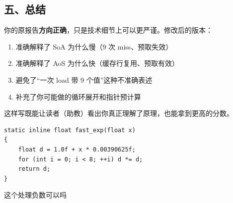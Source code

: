 \documentclass[11pt, a4paper]{article}
\begin{document}
\begin{aibox}
\subsection*{五、总结}

你的原报告\textbf{方向正确}，只是技术细节上可以更严谨。修改后的版本：
\begin{enumerate}
    \item [$\checkmark$] 准确解释了 SoA 为什么慢（9 次 miss、预取失效）
    \item [$\checkmark$] 准确解释了 AoS 为什么快（缓存行复用、预取有效）
    \item [$\checkmark$] 避免了“一次 load 带 9 个值”这种不准确表述
    \item [$\checkmark$] 补充了你可能做的循环展开和指针预计算
\end{enumerate}

这样写既能让读者（助教）看出你真正理解了原理，也能拿到更高的分数。
\end{aibox}

\vspace{1.5em}

\begin{userbox}
\begin{verbatim}
static inline float fast_exp(float x)
{
    float d = 1.0f + x * 0.00390625f;
    for (int i = 0; i < 8; ++i) d *= d;
    return d;
}
\end{verbatim}
这个处理负数可以吗
\end{userbox}
\end{document}
